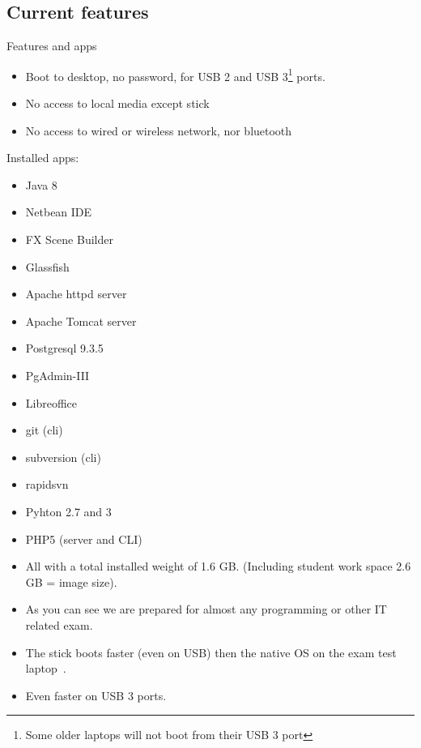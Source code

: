 \subsection{Current features}
\begin{frame}[shrink]{Features and apps}
\begin{itemize}
\item Boot to desktop, no password, for USB 2 and USB 3\footnote{Some
    older laptops will not boot from their USB 3 port} ports.
\item No access to local media except stick
\item No access to wired or wireless network, nor bluetooth
\end{itemize}
Installed apps:{\scriptsize
\begin{multicols}{2}
  \begin{itemize}
  \item Java 8
  \item Netbean IDE
  \item FX Scene Builder
  \item Glassfish
  \item Apache httpd server
  \item Apache Tomcat server
  \item Postgresql 9.3.5
  \item PgAdmin-III
  \item Libreoffice
  \item git (cli)
  \item subversion (cli)
  \item rapidsvn
  \item Pyhton 2.7 and 3
  \item PHP5 (server and CLI)
  \end{itemize}
\end{multicols}}
\begin{itemize}
\item All with a total installed weight of 1.6 GB. (Including student
  work space 2.6 GB = image size).
\item As you can see we are prepared for almost any programming or
  other IT related exam.
\item The stick boots faster (even on USB) then the native OS on the 
  exam test laptop~\InlineSmiley.
\item Even faster on USB 3 ports.
\end{itemize}
\end{frame}


